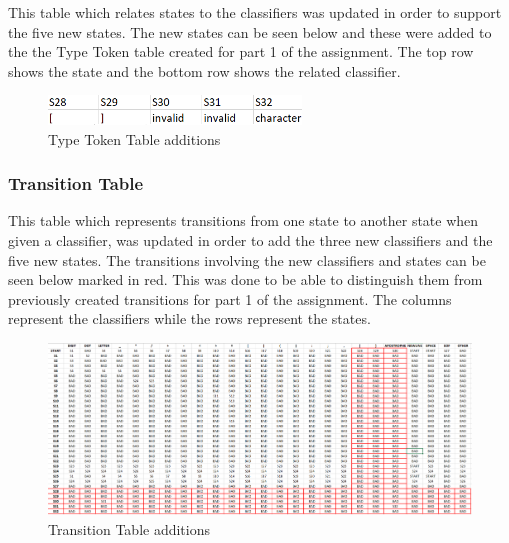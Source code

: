 \documentclass{article}
\begin{document}
			This table which relates states to the classifiers was updated in order to support the five new states. The new states can be seen below and these were added to the the Type Token table created for part 1 of the assignment. The top row shows the state and the bottom row shows the related classifier.
			
			 \begin{center}
					\begin{figure}[H]
			 			\includegraphics[width=0.6\textwidth]{ttpart2.png}
			 			\centering
			  			\caption{Type Token Table additions}
			  			\label{fig:tttable}
					\end{figure}
				\end{center}
				
				
				\subsubsection{Transition Table}
			
			This table which represents transitions from one state to another state when given a classifier, was updated in order to add the three new classifiers and the five new states. The transitions involving the new classifiers and states can be seen below marked in red. This was done to be able to distinguish them from previously created transitions for part 1 of the assignment. The columns represent the classifiers while the rows represent the states.
			
			 \begin{figure}
			 			\includegraphics[width=\textwidth]{txpart2.png}
			 			\centering
			  			\caption{Transition Table additions}
			  			\label{fig:txtable}
				\end{figure}
			
			\pagebreak
			
\end{document}
